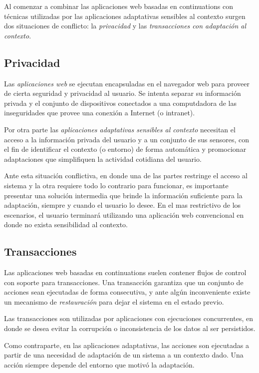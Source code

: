 Al comenzar a combinar las aplicaciones web basadas en continuations con técnicas utilizadas por las aplicaciones adaptativas sensibles al contexto surgen dos situaciones de conflicto: la \emph{privacidad} y las \emph{transacciones con adaptación al contexto}.


\subsection{Privacidad}

Las \emph{aplicaciones web} se ejecutan encapsuladas en el navegador web para proveer de cierta seguridad y privacidad al usuario. Se intenta separar su información privada y el conjunto de dispositivos conectados a una computdadora de las inseguridades que provee una conexión a Internet (o intranet).

Por otra parte las \emph{aplicaciones adaptativas sensibles al contexto} necesitan el acceso a la información privada del usuario y a un conjunto de sus sensores, con el fin de identificar el contexto (o entorno) de forma automática y promocionar adaptaciones que simplifiquen la actividad cotidiana del usuario.

Ante esta situación conflictiva, en donde una de las partes restringe el acceso al sistema y la otra requiere todo lo contrario para funcionar, es importante presentar una solución intermedia que brinde la información suficiente para la adaptación, siempre y cuando el usuario lo desee. En el mas restrictivo de los escenarios, el usuario terminará utilizando una aplicación web convencional en donde no exista sensibilidad al contexto.


\subsection{Transacciones}

Las aplicaciones web basadas en continuations suelen contener flujos de control con soporte para transacciones. Una transacción garantiza que un conjunto de acciones sean ejecutadas de forma consecutiva, y ante algún inconveniente existe un mecanismo de \emph{restauración} para dejar el sistema en el estado previo.

Las transacciones son utilizadas por aplicaciones con ejecuciones concurrentes, en donde se desea evitar la corrupción o inconsistencia de los datos al ser persistidos.

Como contraparte, en las aplicaciones adaptativas, las acciones son ejecutadas a partir de una necesidad de adaptación de un sistema a un contexto dado. Una acción siempre depende del entorno que motivó la adaptación.

